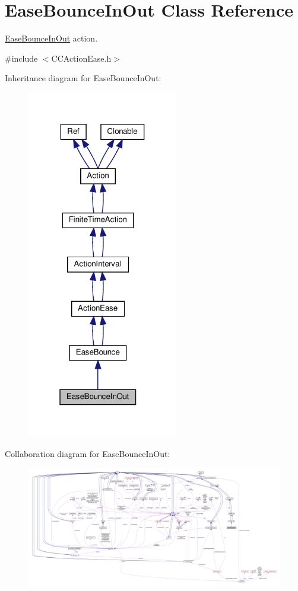 \hypertarget{classEaseBounceInOut}{}\section{Ease\+Bounce\+In\+Out Class Reference}
\label{classEaseBounceInOut}


\hyperlink{classEaseBounceInOut}{Ease\+Bounce\+In\+Out} action.  




{\ttfamily \#include $<$C\+C\+Action\+Ease.\+h$>$}



Inheritance diagram for Ease\+Bounce\+In\+Out\+:
\nopagebreak
\begin{figure}[H]
\begin{center}
\leavevmode
\includegraphics[width=187pt]{classEaseBounceInOut__inherit__graph}
\end{center}
\end{figure}


Collaboration diagram for Ease\+Bounce\+In\+Out\+:
\nopagebreak
\begin{figure}[H]
\begin{center}
\leavevmode
\includegraphics[width=350pt]{classEaseBounceInOut__coll__graph}
\end{center}
\end{figure}
